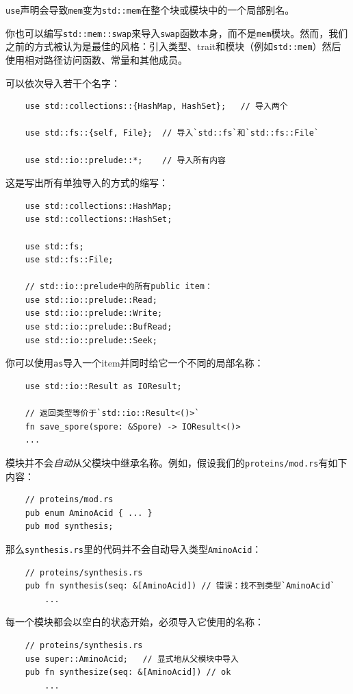 \texttt{use}声明会导致\texttt{mem}变为\texttt{std::mem}在整个块或模块中的一个局部别名。

你也可以编写\texttt{std::mem::swap}来导入\texttt{swap}函数本身，而不是\texttt{mem}模块。然而，我们之前的方式被认为是最佳的风格：引入类型、trait和模块（例如\texttt{std::mem}）然后使用相对路径访问函数、常量和其他成员。

可以依次导入若干个名字：
\begin{verbatim}
    use std::collections::{HashMap, HashSet};   // 导入两个
    
    use std::fs::{self, File};  // 导入`std::fs`和`std::fs::File`
    
    use std::io::prelude::*;    // 导入所有内容
\end{verbatim}

这是写出所有单独导入的方式的缩写：
\begin{verbatim}
    use std::collections::HashMap;
    use std::collections::HashSet;

    use std::fs;
    use std::fs::File;

    // std::io::prelude中的所有public item：
    use std::io::prelude::Read;
    use std::io::prelude::Write;
    use std::io::prelude::BufRead;
    use std::io::prelude::Seek;
\end{verbatim}

你可以使用\texttt{as}导入一个item并同时给它一个不同的局部名称：
\begin{verbatim}
    use std::io::Result as IOResult;

    // 返回类型等价于`std::io::Result<()>`
    fn save_spore(spore: &Spore) -> IOResult<()>
    ...
\end{verbatim}

模块并不会\emph{自动}从父模块中继承名称。例如，假设我们的\texttt{proteins/mod.rs}有如下内容：
\begin{verbatim}
    // proteins/mod.rs
    pub enum AminoAcid { ... }
    pub mod synthesis;
\end{verbatim}

那么\texttt{synthesis.rs}里的代码并不会自动导入类型\texttt{AminoAcid}：
\begin{verbatim}
    // proteins/synthesis.rs
    pub fn synthesis(seq: &[AminoAcid]) // 错误：找不到类型`AminoAcid`
        ...
\end{verbatim}

每一个模块都会以空白的状态开始，必须导入它使用的名称：
\begin{verbatim}
    // proteins/synthesis.rs
    use super::AminoAcid;   // 显式地从父模块中导入
    pub fn synthesize(seq: &[AminoAcid]) // ok
        ...
\end{verbatim}

